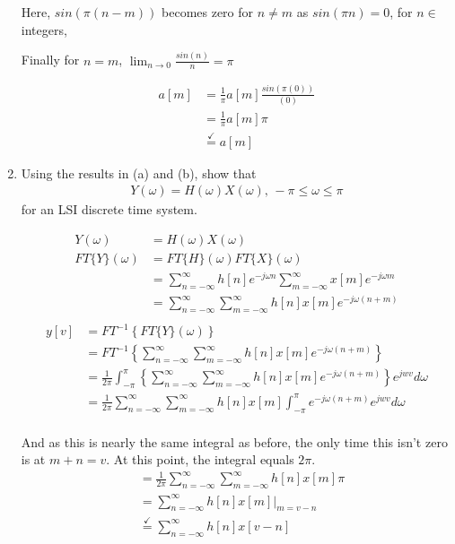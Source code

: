 \documentclass[12pt]{article}
\begin{document}
\begin{enumerate}[label=(\alph*)]
Here, $sin(\pi(n-m))$ becomes zero for $n\neq m$ as $sin(\pi n)=0$, for $n\in$ integers, 

Finally for $n=m$, $\lim_{n\to 0}\frac{sin(n)}{n}=\pi$

\begin{align*}
  a[m]&=\frac{1}{\pi} a[m]         \frac{sin(\pi(0))}{(0)}\\
  &=\frac{1}{\pi} a[m]         \pi\\
  &\stackrel{\checkmark}{=}a[m] 
\end{align*}





  \item Using the results in (a) and (b), show that
\begin{align*}
  Y(\omega)=H(\omega)X(\omega)\text{,   }-\pi\leq\omega\leq\pi
\end{align*}
for an LSI discrete time system.



\begin{align*}
  Y(\omega)&=H(\omega)X(\omega)\\
  FT\{Y\}(\omega)&=FT\{H\}(\omega)FT\{X\}(\omega)\\
                 &=\sum_{n=-\infty}^\infty h[n]e^{-j\omega n}    \sum_{m=-\infty}^\infty x[m]e^{-j\omega m}\\
                 &=\sum_{n=-\infty}^\infty \sum_{m=-\infty}^\infty h[n]x[m]e^{-j\omega (n + m)}\\
\end{align*}
\begin{align*}
  y[v] &=FT^{-1}\left\{FT\{Y\}(\omega)\right\}\\
  &=FT^{-1}\left\{ \sum_{n=-\infty}^\infty \sum_{m=-\infty}^\infty h[n]x[m]e^{-j\omega (n + m)} \right\}\\
  &=\frac{1}{2\pi}\int_{-\pi}^{\pi}\left\{ \sum_{n=-\infty}^\infty \sum_{m=-\infty}^\infty h[n]x[m]e^{-j\omega (n + m)} \right\}e^{jwv}d\omega \\
  &=\frac{1}{2\pi} \sum_{n=-\infty}^\infty \sum_{m=-\infty}^\infty h[n]x[m]\int_{-\pi}^{\pi}e^{-j\omega (n + m)} e^{jwv}d\omega \\
\end{align*}

And as this is nearly the same integral as before, the only time this isn't zero is at $m+n=v$. At this point, the integral equals $2\pi$.
\begin{align*}
  &=\frac{1}{2\pi} \sum_{n=-\infty}^\infty \sum_{m=-\infty}^\infty h[n]x[m] \pi \\
  &=\sum_{n=-\infty}^\infty  h[n]x[m]\big|_{m=v-n}\\
  &\stackrel{\checkmark}{=}\sum_{n=-\infty}^\infty h[n]x[v-n]\\ 
\end{align*}



\end{enumerate}
\newpage
\end{document}
